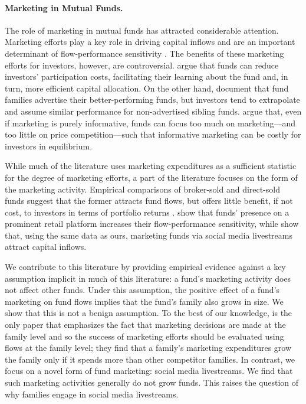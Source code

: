 \documentclass[12pt]{article}
\begin{document}
\paragraph{Marketing in Mutual Funds.} The role of marketing in mutual funds has attracted considerable attention. Marketing efforts play a key role in driving capital inflows \citep{jain2000truth,gallaher2008advertising} and are an important determinant of flow-performance sensitivity \citep{huang2007participation,gallaher2008advertising,christofferson2013what}. The benefits of these marketing efforts for investors, however, are controversial.\@ \citet{huang2007participation} argue that funds can reduce investors' participation costs, facilitating their learning about the fund and, in turn, more efficient capital allocation. On the other hand, \citet{koehler2009selection} document that fund families advertise their better-performing funds, but investors tend to extrapolate and assume similar performance for non-advertised sibling funds.\@ \citet{roussanov2021marketing} argue that, even if marketing is purely informative, funds can focus too much on marketing---and too little on price competition---such that informative marketing can be costly for investors in equilibrium. 

While much of the literature uses marketing expenditures as a sufficient statistic for the degree of marketing efforts, a part of the literature focuses on the form of the marketing activity. Empirical comparisons of broker-sold and direct-sold funds suggest that the former attracts fund flows, but offers little benefit, if not cost, to investors in terms of portfolio returns \citep{berstresser2009assessing,christofferson2013what,chalmers2020is}.\@ \citet{hong2025fintech} show that funds' presence on a prominent retail platform increases their flow-performance sensitivity, while \citet{dehaan2025social} show that, using the same data as ours, marketing funds via social media livestreams attract capital inflows.

We contribute to this literature by providing empirical evidence against a key assumption implicit in much of this literature: a fund's marketing activity does not affect other funds. Under this assumption, the positive effect of a fund's marketing on fund flows implies that the fund's family also grows in size. We show that this is not a benign assumption. To the best of our knowledge, \citet{gallaher2008advertising} is the only paper that emphasizes the fact that marketing decisions are made at the family level and so the success of marketing efforts should be evaluated using flows at the family level; they find that a family's marketing expenditures grow the family only if it spends more than other competitor families. In contrast, we focus on a novel form of fund marketing: social media livestreams. We find that such marketing activities generally do not grow funds. This raises the question of why families engage in social media livestreams.
\end{document}
